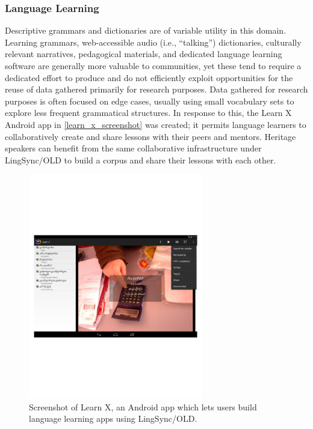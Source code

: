 \documentclass[11pt]{article}
\begin{document}
\subsubsection{Language Learning}

Descriptive grammars and dictionaries are of variable utility in this domain.
Learning grammars, web-accessible audio (i.e., ``talking'') dictionaries,
culturally relevant narratives, pedagogical materials, and dedicated language
learning software are generally more valuable to communities, yet these tend to
require a dedicated effort to produce and do not efficiently exploit
opportunities for the reuse of data gathered primarily for research purposes. 
Data gathered for research purposes is often focused on edge cases, usually
using small vocabulary sets to explore less frequent grammatical structures.
In response to this, the Learn X Android app in \autoref{learn_x_screenshot}
was created; it permits language learners to collaboratively create and share
lessons with their peers and mentors. Heritage speakers can benefit from the
same collaborative infrastructure under LingSync/OLD to build a corpus and share
their lessons with each other. 



\begin{figure}
\begin{center}
\includegraphics[width=3in]{images/learnX}
\caption{Screenshot of Learn X, an Android app which lets users build language
learning apps using LingSync/OLD.}
\label{learn_x_screenshot}
\end{center}
\end{figure}
\end{document}
